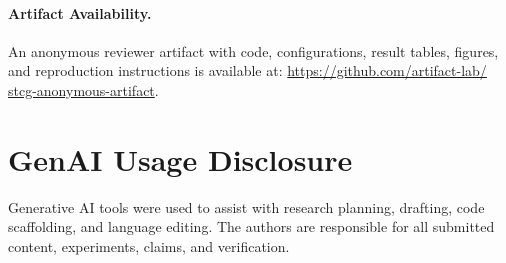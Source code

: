 \documentclass[sigconf,review,anonymous]{acmart}
\begin{document}
\paragraph*{Artifact Availability.}
\begin{sloppypar}
An anonymous reviewer artifact with code, configurations, result tables, figures, and reproduction instructions is available at:
\href{https://github.com/artifact-lab/stcg-anonymous-artifact}{\url{https://github.com/artifact-lab/}}\\
\href{https://github.com/artifact-lab/stcg-anonymous-artifact}{\url{stcg-anonymous-artifact}}.
\end{sloppypar}

\section*{GenAI Usage Disclosure}

Generative AI tools were used to assist with research planning, drafting, code scaffolding, and language editing. The authors are responsible for all submitted content, experiments, claims, and verification.



\end{document}
